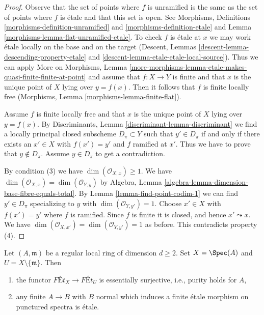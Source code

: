 \begin{proof}
Observe that the set of points where $f$ is unramified is the same as
the set of points where $f$ is \'etale and that this set is open.
See Morphisms, Definitions \ref{morphisms-definition-unramified}
and \ref{morphisms-definition-etale} and
Lemma \ref{morphisms-lemma-flat-unramified-etale}.
To check $f$ is \'etale at $x$ we may work \'etale
locally on the base and on the
target (Descent, Lemmas \ref{descent-lemma-descending-property-etale} and
\ref{descent-lemma-etale-etale-local-source}).
Thus we can apply More on Morphisms, Lemma
\ref{more-morphisms-lemma-etale-makes-quasi-finite-finite-at-point}
and assume that $f : X \to Y$ is finite and that $x$ is the unique
point of $X$ lying over $y = f(x)$.
Then it follows that $f$ is finite locally free
(Morphisms, Lemma \ref{morphisms-lemma-finite-flat}).

\medskip\noindent
Assume $f$ is finite locally free and that $x$ is the unique point of
$X$ lying over $y = f(x)$. By
Discriminants, Lemma \ref{discriminant-lemma-discriminant}
we find a locally principal closed subscheme $D_\pi \subset Y$
such that $y' \in D_\pi$ if and only if there exists an $x' \in X$
with $f(x') = y'$ and $f$ ramified at $x'$. Thus we have to prove
that $y \not \in D_\pi$. Assume $y \in D_\pi$ to get a contradiction.

\medskip\noindent
By condition (3) we have $\dim(\mathcal{O}_{X, x}) \geq 1$.
We have $\dim(\mathcal{O}_{X, x}) = \dim(\mathcal{O}_{Y, y})$ by
Algebra, Lemma \ref{algebra-lemma-dimension-base-fibre-equals-total}.
By Lemma \ref{lemma-find-point-codim-1}
we can find $y' \in D_\pi$ specializing to $y$
with $\dim(\mathcal{O}_{Y, y'}) = 1$.
Choose $x' \in X$ with $f(x') = y'$ where $f$ is ramified. Since $f$
is finite it is closed, and hence $x' \leadsto x$.
We have $\dim(\mathcal{O}_{X, x'}) = \dim(\mathcal{O}_{Y, y'}) = 1$
as before. This contradicts property (4).
\end{proof}

\begin{lemma}
\label{lemma-local-purity}
Let $(A, \mathfrak m)$ be a regular local ring of dimension $d \geq 2$.
Set $X = \Spec(A)$ and $U = X \setminus \{\mathfrak m\}$. Then
\begin{enumerate}
\item the functor $\textit{F\'Et}_X \to \textit{F\'Et}_U$
is essentially surjective, i.e., purity holds for $A$,
\item any finite $A \to B$ with $B$ normal which
induces a finite \'etale morphism on punctured spectra is \'etale.
\end{enumerate}
\end{lemma}

